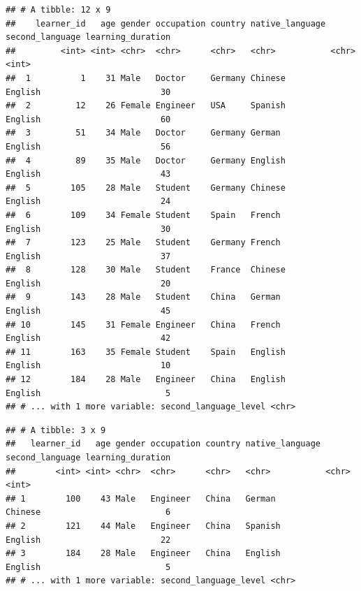 \documentclass[]{book}
\newenvironment{Shaded}{\begin{snugshade}}{\end{snugshade}}
\newcommand{\CommentTok}[1]{\textcolor[rgb]{0.56,0.35,0.01}{\textit{#1}}}
\newcommand{\DecValTok}[1]{\textcolor[rgb]{0.00,0.00,0.81}{#1}}
\newcommand{\KeywordTok}[1]{\textcolor[rgb]{0.13,0.29,0.53}{\textbf{#1}}}
\newcommand{\NormalTok}[1]{#1}
\newcommand{\OperatorTok}[1]{\textcolor[rgb]{0.81,0.36,0.00}{\textbf{#1}}}
\newcommand{\StringTok}[1]{\textcolor[rgb]{0.31,0.60,0.02}{#1}}
\begin{document}
\begin{verbatim}
## # A tibble: 12 x 9
##    learner_id   age gender occupation country native_language second_language learning_duration
##         <int> <int> <chr>  <chr>      <chr>   <chr>           <chr>                       <int>
##  1          1    31 Male   Doctor     Germany Chinese         English                        30
##  2         12    26 Female Engineer   USA     Spanish         English                        60
##  3         51    34 Male   Doctor     Germany German          English                        56
##  4         89    35 Male   Doctor     Germany English         English                        43
##  5        105    28 Male   Student    Germany Chinese         English                        24
##  6        109    34 Female Student    Spain   French          English                        30
##  7        123    25 Male   Student    Germany French          English                        37
##  8        128    30 Male   Student    France  Chinese         English                        20
##  9        143    28 Male   Student    China   German          English                        45
## 10        145    31 Female Engineer   China   French          English                        42
## 11        163    35 Female Student    Spain   English         English                        10
## 12        184    28 Male   Engineer   China   English         English                         5
## # ... with 1 more variable: second_language_level <chr>
\end{verbatim}

\begin{Shaded}
\end{Shaded}

\begin{verbatim}
## # A tibble: 3 x 9
##   learner_id   age gender occupation country native_language second_language learning_duration
##        <int> <int> <chr>  <chr>      <chr>   <chr>           <chr>                       <int>
## 1        100    43 Male   Engineer   China   German          Chinese                         6
## 2        121    44 Male   Engineer   China   Spanish         English                        22
## 3        184    28 Male   Engineer   China   English         English                         5
## # ... with 1 more variable: second_language_level <chr>
\end{verbatim}
\end{document}
